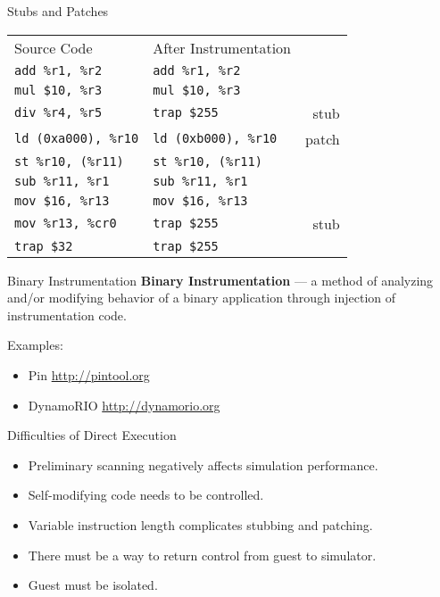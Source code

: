 \begin{frame}{Stubs and Patches}
\begin{tabular}{llr}
Source Code                     &    After Instrumentation               \\
\texttt{add \%r1, \%r2}         &    \texttt{add \%r1, \%r2}             \\
\texttt{mul \$10, \%r3}         &    \texttt{mul \$10, \%r3}             \\
\texttt{div \%r4, \%r5}         &    \texttt{trap \$255}         & stub  \\
\texttt{ld (0xa000), \%r10}     &    \texttt{ld (0xb000), \%r10} & patch \\
\texttt{st \%r10, (\%r11)}      &    \texttt{st \%r10, (\%r11)}          \\
\texttt{sub \%r11, \%r1}        &    \texttt{sub \%r11, \%r1}            \\
\texttt{mov \$16, \%r13}        &    \texttt{mov \$16, \%r13}            \\
\texttt{mov \%r13, \%cr0}       &    \texttt{trap \$255}         & stub  \\
\texttt{trap \$32}              &    \texttt{trap \$255}                 \\
\end{tabular}
\end{frame}

\begin{frame}{Binary Instrumentation}
\textbf{Binary Instrumentation} --- a method of analyzing and/or modifying
behavior of a binary application through injection of instrumentation code.

\bigskip
Examples:
\begin{itemize}
\item Pin \url{http://pintool.org}
\item DynamoRIO \url{http://dynamorio.org}
\end{itemize}
\end{frame}

\begin{frame}[fragile]{Difficulties of Direct Execution}
\begin{itemize}
\item Preliminary scanning negatively affects simulation performance.
\item Self-modifying code needs to be controlled.
\item Variable instruction length complicates stubbing and patching.
\item There must be a way to return control from guest to simulator.
\item Guest must be isolated.
\end{itemize}
\end{frame}

